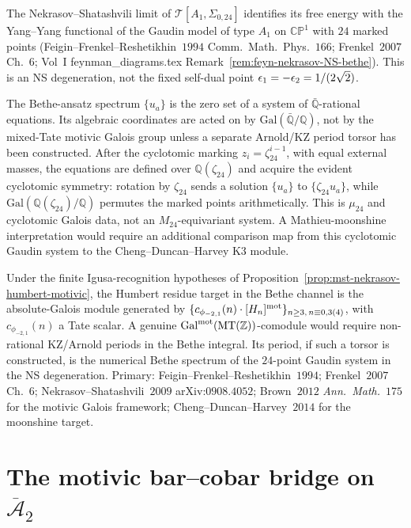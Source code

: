 \begin{remark}
\label{rem:mst-nekrasov-bethe-motivic}
The Nekrasov--Shatashvili limit of
$\mathcal T[A_1, \Sigma_{0,24}]$ identifies its free energy with the
Yang--Yang functional of the Gaudin model of type $A_1$ on
$\mathbb{CP}^1$ with $24$ marked points
(Feigin--Frenkel--Reshetikhin~$1994$ Comm.\ Math.\ Phys.~$166$;
Frenkel~$2007$ Ch.~$6$; Vol~I feynman\_diagrams.tex
Remark~\ref{rem:feyn-nekrasov-NS-bethe}). This is an NS degeneration,
not the fixed self-dual point $\epsilon_1=-\epsilon_2=1/(2\sqrt2)$.

The Bethe-ansatz spectrum $\{u_a\}$ is the zero set of a system of
$\bar{\mathbb Q}$-rational equations. Its algebraic coordinates are
acted on by $\mathrm{Gal}(\bar{\mathbb Q}/\mathbb Q)$, not by the
mixed-Tate motivic Galois group unless a separate Arnold/KZ period
torsor has been constructed. After the cyclotomic marking
$z_i=\zeta_{24}^{i-1}$, with equal external masses, the equations are
defined over $\mathbb Q(\zeta_{24})$ and acquire the evident
cyclotomic symmetry: rotation by $\zeta_{24}$ sends a solution
$\{u_a\}$ to $\{\zeta_{24}u_a\}$, while
$\mathrm{Gal}(\mathbb Q(\zeta_{24})/\mathbb Q)$ permutes the marked
points arithmetically. This is $\mu_{24}$ and cyclotomic Galois data,
not an $M_{24}$-equivariant system. A Mathieu-moonshine interpretation
would require an additional comparison map from this cyclotomic Gaudin
system to the Cheng--Duncan--Harvey K3 module.

Under the finite Igusa-recognition hypotheses of
Proposition~\ref{prop:mst-nekrasov-humbert-motivic}, the Humbert
residue target in the Bethe channel is the absolute-Galois module
generated by
$\{c_{\phi_{-2,1}}(n)\cdot [H_n]^{\mathrm{mot}}\}_{n\geq3,\,
n\equiv0,3(4)}$, with $c_{\phi_{-2,1}}(n)$ a Tate scalar. A genuine
$\mathrm{Gal}^{\mathrm{mot}}(\mathrm{MT}(\mathbb Z))$-comodule would require
non-rational KZ/Arnold periods in the Bethe integral. Its period, if
such a torsor is constructed, is the numerical Bethe spectrum of the
$24$-point Gaudin system in the NS degeneration. Primary:
Feigin--Frenkel--Reshetikhin~$1994$; Frenkel~$2007$ Ch.~$6$;
Nekrasov--Shatashvili~$2009$ arXiv:$0908.4052$; Brown~$2012$
\emph{Ann.\ Math.}~$175$ for the motivic Galois framework;
Cheng--Duncan--Harvey~$2014$ for the moonshine target.
\end{remark}

\section{The motivic bar--cobar bridge on $\overline{\mathcal A}_{2}$}
\label{sec:motivic-barcobar-bridge}

